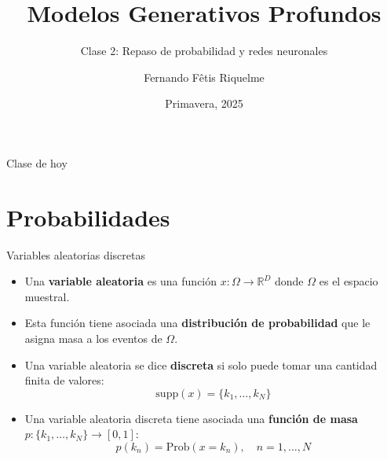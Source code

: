 \documentclass{beamer}
\title{Modelos Generativos Profundos}
\subtitle{Clase 2: Repaso de probabilidad y redes neuronales}
\author{Fernando Fêtis Riquelme}
\institute{
    Facultad de Ciencias Físicas y Matemáticas\\
    Universidad de Chile
}
\date{Primavera, 2025}
\newcommand{\R}{\mathbb{R}}
\begin{document}
\begin{frame}
    \titlepage
\end{frame}

\begin{frame}{Clase de hoy}
    \tableofcontents
\end{frame}

\section{Probabilidades}

\begin{frame}{Variables aleatorias discretas}

    \begin{itemize}
        \item Una \textbf{variable aleatoria} es una función $x:\Omega\to\R^D$ donde $\Omega$ es el espacio muestral. \item Esta función tiene asociada una \textbf{distribución de probabilidad} que le asigna masa a los eventos de $\Omega$.
        \item Una variable aleatoria se dice \textbf{discreta} si solo puede tomar una cantidad finita de valores:
        \begin{equation*}
            \text{supp}(x)=\{k_1,\ldots,k_N\}
        \end{equation*}
        \item Una variable aleatoria discreta tiene asociada una \textbf{función de masa} $p:\{k_1,\ldots,k_N\}\to[0,1]$:
              \begin{equation*}
                  p(k_n)=\text{Prob}(x=k_n),\quad n=1,\ldots,N
              \end{equation*}
    \end{itemize}

\end{frame}
\end{document}
